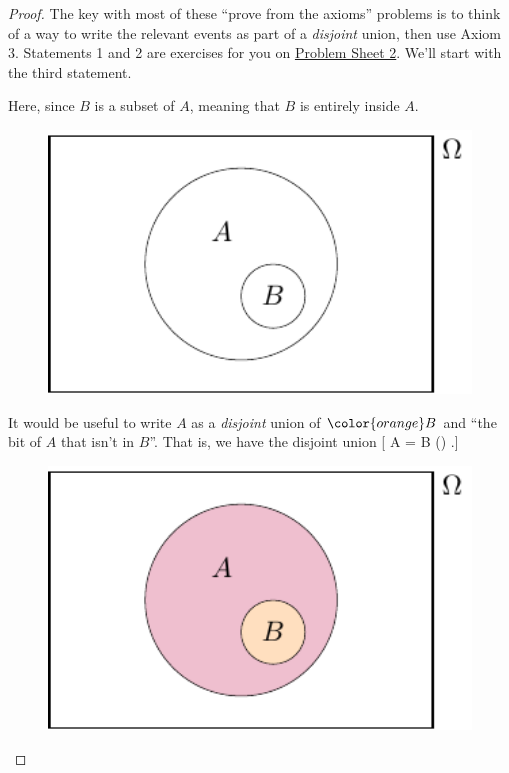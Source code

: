 \documentclass[
  letterpaper,
]{report}
\theoremstyle{definition}
\theoremstyle{definition}
\theoremstyle{remark}
\begin{document}
\begin{proof}

The key with most of these ``prove from the axioms'' problems is to
think of a way to write the relevant events as part of a \emph{disjoint}
union, then use Axiom 3. Statements 1 and 2 are exercises for you on
\protect\hyperlink{P2}{Problem Sheet 2}. We'll start with the third
statement.

Here, since \(B\) is a subset of \(A\), meaning that \(B\) is entirely
inside \(A\).

\begin{figure}

{\centering \includegraphics[width=4.44444in,height=\textheight]{sections/L04-probability_files/figure-pdf/subs0-1.pdf}

}

\end{figure}

It would be useful to write \(A\) as a \emph{disjoint} union of
\(\color{orange}B\) and {``the bit of \(A\) that isn't in \(B\)''}. That
is, we have the disjoint union {[} A = \color{orange}B
\cup () .{]}

\begin{figure}

{\centering \includegraphics[width=4.44444in,height=\textheight]{sections/L04-probability_files/figure-pdf/subs-1.pdf}

}
\end{figure}
\end{proof}
\end{document}
